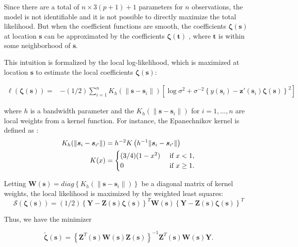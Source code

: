 \documentclass[authoryear,review, 12pt]{elsarticle}
\begin{document}
Since there are a total of $n\times3(p+1)+1$ parameters for $n$
observations, the model is not identifiable and it is not possible
to directly maximize the total likelihood. But when the coefficient
functions are smooth, the coefficients $\bm{\zeta}\left(\bm{s}\right)$
at location $\bm{s}$ can be approximated by the coefficients $\bm{\zeta}\left(\bm{t}\right)$
, where $\bm{t}$ is within some neighborhood of $\bm{s}$.

This intuition is formalized by the local log-likelihood, which is
maximized at location $\bm{s}$ to estimate the local coefficients
$\bm{\zeta}(\bm{s})$:

\begin{align}
\ell\left(\bm{\zeta}(\bm{s})\right)= & -(1/2)\sum_{i=1}^{n}K_{h}(\|\bm{s}-\bm{s}_{i}\|)\left[\log\sigma^{2}+\sigma^{-2}\left\{ y\left(\bm{s}_{i}\right)-\bm{z}'\left(\bm{s}_{i}\right)\bm{\zeta}\left(\bm{s}\right)\right\} ^{2}\right]\label{eq:local-log-likelihood}
\end{align}


where $h$ is a bandwidth parameter and the $K_{h}\left(\|\bm{s}-\bm{s}_{i}\|\right)$
for $i=1,\dots,n$ are local weights from a kernel function. For instance,
the Epanechnikov kernel is defined as \citep{Samiuddin-el-Sayyad-1990}:
\begin{align}
K_{h}(\|\bm{s}_{i}-\bm{s}_{i'}\|) & =h^{-2}K\left(h^{-1}\|\bm{s}_{i}-\bm{s}_{i'}\|\right)\notag\label{eq:epanechnikov}\\
K(x) & =\begin{cases}
(3/4)(1-x^{2}) & \mbox{ if }x<1,\\
0 & \mbox{ if }x\geq1.
\end{cases}
\end{align}


Letting $\bm{W}(\bm{s})=diag\left\{ K_{h}(\|\bm{s}-\bm{s}_{i}\|)\right\} $
be a diagonal matrix of kernel weights, the local likelihood is maximized
by the weighted least squares: 
\[
\mathcal{S}\left(\bm{\zeta}\left(\bm{s}\right)\right)=(1/2)\left\{ \bm{Y}-\bm{Z}(\bm{s})\bm{\zeta}(\bm{s})\right\} ^{T}\bm{W}(\bm{s})\left\{ \bm{Y}-\bm{Z}(\bm{s})\bm{\zeta}(\bm{s})\right\} ^{T}
\]


Thus, we have the minimizer

\begin{equation}
\tilde{\bm{\zeta}}(\bm{s})=\left\{ \bm{Z}^{T}(\bm{s})\bm{W}(\bm{s})\bm{Z}(\bm{s})\right\} ^{-1}\bm{Z}^{T}(\bm{s})\bm{W}(\bm{s})\bm{Y}.\label{eq:zeta-hat}
\end{equation}
\end{document}
